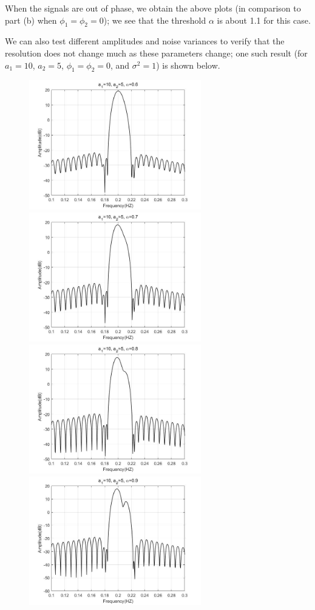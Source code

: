\documentclass[UTF-8, a4paper, 12pt]{ctexart}
\begin{document}
When the signals are out of phase, we obtain the above plots (in comparison to part (b) when $ \phi_1 = \phi_2 = 0$); we see that the threshold $\alpha$ is about 1.1 for this case.


We can also test different amplitudes and noise variances to verify that the resolution does not change much as these parameters change; one such result (for $a_1 = 10$, $a_2 = 5$, $\phi_1 = \phi_2 = 0$, and $\sigma^2 = 1$) is shown below.
\begin{figure}[htbp]
    \centering
    \includegraphics[width=7.5cm]{2/dd06.jpg}
    \includegraphics[width=7.5cm]{2/dd07.jpg}
    \includegraphics[width=7.5cm]{2/dd08.jpg}
    \includegraphics[width=7.5cm]{2/dd09.jpg}

\end{figure}
\end{document}
